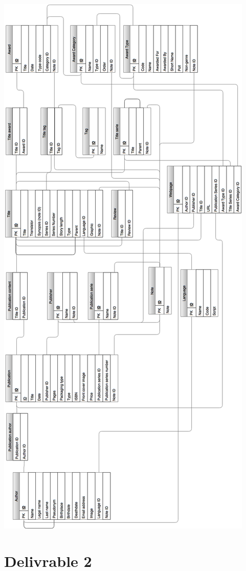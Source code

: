 \documentclass[doubleside, titlepage]{article}
\begin{document}
\begin{center}
    \includegraphics[scale = 0.4]{DBMS}
\end{center}

\part{Delivrable 2}
\end{document}
